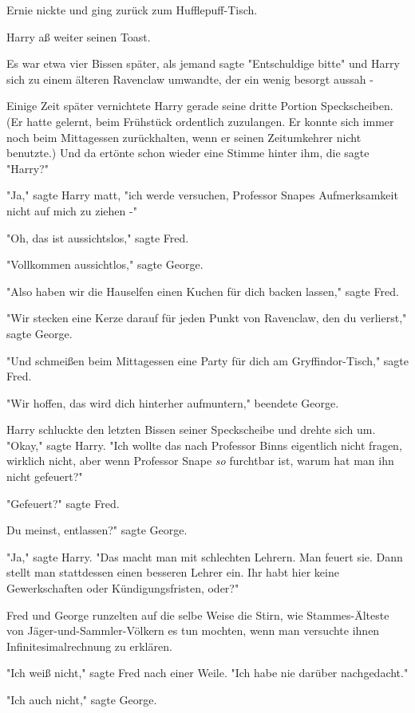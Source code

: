 {Ernie nickte und ging zurück zum Hufflepuff-Tisch.

Harry aß weiter seinen Toast.

Es war etwa vier Bissen später, als jemand sagte "Entschuldige bitte" und Harry sich zu einem älteren Ravenclaw umwandte, der ein wenig besorgt aussah -

Einige Zeit später vernichtete Harry gerade seine dritte Portion Speckscheiben. (Er hatte gelernt, beim Frühstück ordentlich zuzulangen. Er konnte sich immer noch beim Mittagessen zurückhalten, wenn er seinen Zeitumkehrer nicht benutzte.) Und da ertönte schon wieder eine Stimme hinter ihm, die sagte "Harry?"

"Ja," sagte Harry matt, "ich werde versuchen, Professor Snapes Aufmerksamkeit nicht auf mich zu ziehen -"

"Oh, das ist aussichtslos," sagte Fred.

"Vollkommen aussichtlos," sagte George.

"Also haben wir die Hauselfen einen Kuchen für dich backen lassen," sagte Fred.

"Wir stecken eine Kerze darauf für jeden Punkt von Ravenclaw, den du verlierst," sagte George.

"Und schmeißen beim Mittagessen eine Party für dich am Gryffindor-Tisch," sagte Fred.

"Wir hoffen, das wird dich hinterher aufmuntern," beendete George.

Harry schluckte den letzten Bissen seiner Speckscheibe und drehte sich um. "Okay," sagte Harry. "Ich wollte das nach Professor Binns eigentlich nicht fragen, wirklich nicht, aber wenn Professor Snape \emph{so} furchtbar ist, warum hat man ihn nicht gefeuert?"

"Gefeuert?" sagte Fred.

Du meinst, entlassen?" sagte George.

"Ja," sagte Harry. "Das macht man mit schlechten Lehrern. Man feuert sie. Dann stellt man stattdessen einen besseren Lehrer ein. Ihr habt hier keine Gewerkschaften oder Kündigungsfristen, oder?"

Fred und George runzelten auf die selbe Weise die Stirn, wie Stammes-Älteste von Jäger-und-Sammler-Völkern es tun mochten, wenn man versuchte ihnen Infinitesimalrechnung zu erklären.

"Ich weiß nicht," sagte Fred nach einer Weile. "Ich habe nie darüber nachgedacht."

"Ich auch nicht," sagte George.

}
